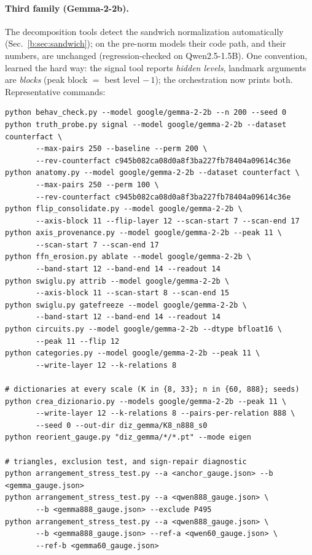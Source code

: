 \documentclass[11pt]{article}
\begin{document}
\paragraph{Third family (Gemma-2-2b).} The decomposition tools detect the
sandwich normalization automatically (Sec.~\ref{b:sec:sandwich}); on the
pre-norm models their code path, and their numbers, are unchanged
(regression-checked on Qwen2.5-1.5B). One convention, learned the hard
way: the signal tool reports \emph{hidden levels}, landmark arguments are
\emph{blocks} (peak block $=$ best level $-\,1$); the orchestration now
prints both. Representative commands:

\begin{verbatim}
python behav_check.py --model google/gemma-2-2b --n 200 --seed 0
python truth_probe.py signal --model google/gemma-2-2b --dataset counterfact \
       --max-pairs 250 --baseline --perm 200 \
       --rev-counterfact c945b082ca08d0a8f3ba227fb78404a09614c36e
python anatomy.py --model google/gemma-2-2b --dataset counterfact \
       --max-pairs 250 --perm 100 \
       --rev-counterfact c945b082ca08d0a8f3ba227fb78404a09614c36e
python flip_consolidate.py --model google/gemma-2-2b \
       --axis-block 11 --flip-layer 12 --scan-start 7 --scan-end 17
python axis_provenance.py --model google/gemma-2-2b --peak 11 \
       --scan-start 7 --scan-end 17
python ffn_erosion.py ablate --model google/gemma-2-2b \
       --band-start 12 --band-end 14 --readout 14
python swiglu.py attrib --model google/gemma-2-2b \
       --axis-block 11 --scan-start 8 --scan-end 15
python swiglu.py gatefreeze --model google/gemma-2-2b \
       --band-start 12 --band-end 14 --readout 14
python circuits.py --model google/gemma-2-2b --dtype bfloat16 \
       --peak 11 --flip 12
python categories.py --model google/gemma-2-2b --peak 11 \
       --write-layer 12 --k-relations 8

# dictionaries at every scale (K in {8, 33}; n in {60, 888}; seeds)
python crea_dizionario.py --models google/gemma-2-2b --peak 11 \
       --write-layer 12 --k-relations 8 --pairs-per-relation 888 \
       --seed 0 --out-dir diz_gemma/K8_n888_s0
python reorient_gauge.py "diz_gemma/*/*.pt" --mode eigen

# triangles, exclusion test, and sign-repair diagnostic
python arrangement_stress_test.py --a <anchor_gauge.json> --b <gemma_gauge.json>
python arrangement_stress_test.py --a <qwen888_gauge.json> \
       --b <gemma888_gauge.json> --exclude P495
python arrangement_stress_test.py --a <qwen888_gauge.json> \
       --b <gemma888_gauge.json> --ref-a <qwen60_gauge.json> \
       --ref-b <gemma60_gauge.json>
\end{verbatim}
\end{document}
